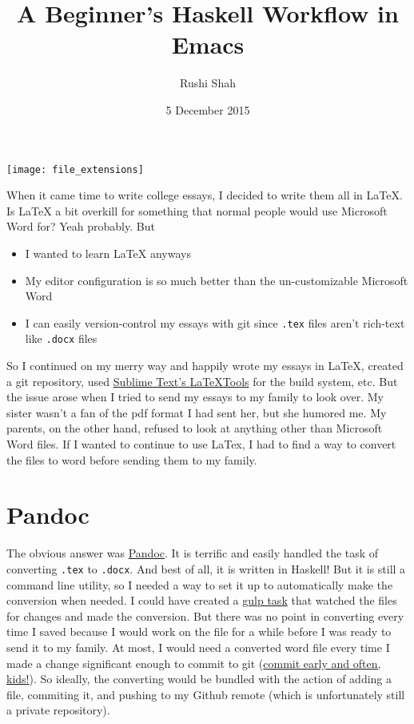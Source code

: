 \documentclass[12pt]{article}
\title{A Beginner's Haskell Workflow in Emacs}
\author{Rushi Shah}
\date{5 December 2015}
\begin{document}
  \maketitle

\begin{center}
\texttt{[image: file\_extensions]}
\end{center}

When it came time to write college essays, I decided to write them all
in LaTeX. Is LaTeX a bit overkill for something that normal people would
use Microsoft Word for? Yeah probably. But

\begin{itemize}
\item
  I wanted to learn LaTeX anyways
\item
  My editor configuration is so much better than the un-customizable
  Microsoft Word
\item
  I can easily version-control my essays with git since \texttt{.tex}
  files aren't rich-text like \texttt{.docx} files
\end{itemize}

So I continued on my merry way and happily wrote my essays in LaTeX,
created a git repository, used
\href{https://github.com/SublimeText/LaTeXTools}{Sublime Text's
LaTeXTools} for the build system, etc. But the issue arose when I tried
to send my essays to my family to look over. My sister wasn't a fan of
the pdf format I had sent her, but she humored me. My parents, on the
other hand, refused to look at anything other than Microsoft Word files.
If I wanted to continue to use LaTex, I had to find a way to convert the
files to word before sending them to my family.

\section{Pandoc}\label{pandoc}

The obvious answer was \href{http://pandoc.org/}{Pandoc}. It is terrific
and easily handled the task of converting \texttt{.tex} to
\texttt{.docx}. And best of all, it is written in Haskell! But it is
still a command line utility, so I needed a way to set it up to
automatically make the conversion when needed. I could have created a
\href{http://gulpjs.com/}{gulp task} that watched the files for changes
and made the conversion. But there was no point in converting every time
I saved because I would work on the file for a while before I was ready
to send it to my family. At most, I would need a converted word file
every time I made a change significant enough to commit to git
(\href{http://www.databasically.com/2011/03/14/git-commit-early-commit-often/}{commit
early and often, kids!}). So ideally, the converting would be bundled
with the action of adding a file, commiting it, and pushing to my Github
remote (which is unfortunately still a private repository).
\end{document}
